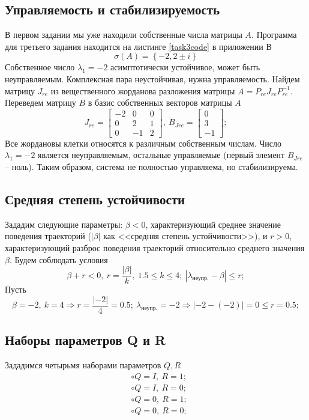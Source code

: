 \documentclass[a4paper, 12pt]{article}
\begin{document}
    \subsection{Управляемость и стабилизируемость}
    В первом задании мы уже находили собственные числа матрицы $A$. Программа для третьего задания
    находится на листинге \ref{task3code} в приложении В
    $$
    \sigma\left( A \right)=\left\{ -2,2\pm i \right\}
    $$
    Собственное число $\lambda_1=-2$ асимптотически устойчивое, может быть неуправляемым. Комплексная пара неустойчивая,
    нужна управляемость. Найдем матрицу $J_{re}$ из вещественного жорданова разложения матрицы $A=P_{re}J_{re}P_{re}^{-1}$.
    Переведем матрицу $B$ в базис собственных векторов матрицы $A$
    $$
    J_{re}=\begin{bmatrix}
    -2     &0     &0\\
    0     &2     &1\\
    0    &-1     &2
    \end{bmatrix},\ B_{Jre}=\begin{bmatrix}
        0\\
     3\\
    -1
    \end{bmatrix};
    $$
    Все жордановы клетки относятся к различным собственным числам. Число $\lambda_1=-2$ является неуправляемым,
    остальные управляемые (первый элемент $B_{Jre}$ -- ноль). Таким образом, система не полностью управляема,
    но стабилизируема.


    \subsection{Средняя степень устойчивости}
    Зададим следующие параметры: $\beta<0$,
    характеризующий среднее значение поведения
    траекторий ($|\beta|$ как <<средняя степень устойчивости>>),
    и $r>0$, характеризующий разброс поведения траекторий относительно
    среднего значения $\beta$. Будем соблюдать условия
    $$
    \beta+r<0,\ r=\dfrac{|\beta|}{k},\ 1.5\leq k\leq 4;\ |\lambda_{\text{неупр.}}-\beta|\leq r;
    $$
    Пусть
    $$
    \beta=-2,\ k=4\Rightarrow r=\dfrac{|-2|}{4}=0.5;\ \lambda_{\text{неупр.}}=-2\Rightarrow |-2-(-2)|=0\leq r=0.5;
    $$


    \subsection{Наборы параметров Q и R}
    Зададимся четырьмя наборами параметров $Q,R$
    \begin{align*}
        &\circ Q=I,\ R=1;\\
        &\circ Q=I,\ R=0;\\
        &\circ Q=0,\ R=1;\\
        &\circ Q=0,\ R=0;
    \end{align*}
\end{document}

